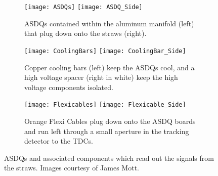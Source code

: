\begin{figure}
\centering
    \begin{subfigure}[t]{1\textwidth}
    \centering
        \texttt{[image: ASDQs]}
    \hspace{1mm}
        \texttt{[image: ASDQ\_Side]}
    \caption{ASDQs contained within the aluminum manifold (left) that plug down onto the straws (right).}
    \label{fig:ASDQs}
    \end{subfigure}
    \begin{subfigure}[t]{1\textwidth}
    \centering
        \texttt{[image: CoolingBars]}
    \hspace{1mm}
        \texttt{[image: CoolingBar\_Side]}
    \caption{Copper cooling bars (left) keep the ASDQs cool, and a high voltage spacer (right in white) keep the high voltage components isolated.}
    \end{subfigure}
    \begin{subfigure}[t]{1\textwidth}
    \centering
        \texttt{[image: Flexicables]}
    \hspace{1mm}
        \texttt{[image: Flexicable\_Side]}
    \caption{Orange Flexi Cables plug down onto the ASDQ boards and run left through a small aperture in the tracking detector to the TDCs.}
    \label{fig:flexis}
    \end{subfigure}
\caption[Tracker ASDQs and associated components]{ASDQs and associated components which read out the signals from the straws. Images courtesy of James Mott.}
\end{figure}




